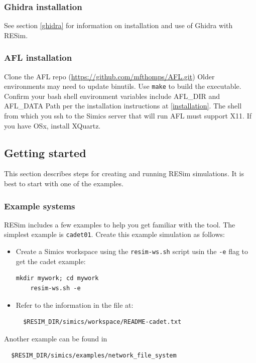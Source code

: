 \documentclass[titlepage]{article}
\begin{document}
\subsubsection{Ghidra installation}
See section \ref{ghidra} for information on installation and use of Ghidra with RESim.

\subsubsection{AFL installation}
Clone the AFL repo (\url{https://github.com/mfthomps/AFL.git})   Older environments may need to update binutils. Use {\tt make} to build the executable.
Confirm your bash shell environment variables include AFL\_DIR and AFL\_DATA Path per the installation instructions at \ref{installation}.
The shell from which you ssh to the Simics server that will run AFL must support X11.  If you have OSx, install XQuartz.

\subsection{Getting started}
\label{getting-started}
This section describes steps for creating and running RESim simulations.
It is best to start with one of the examples.

\subsubsection{Example systems}
RESim includes a few examples to help you get familiar with the tool.  
The simplest example is {\tt cadet01}.  Create this example simulation as follows:
\begin{itemize}
\item Create a Simics workspace using the {\tt resim-ws.sh} script usin the {\tt -e} flag to get the cadet example:
\begin{verbatim}
mkdir mywork; cd mywork
    resim-ws.sh -e
\end{verbatim}
\item Refer to the information in the file at:
\begin{verbatim}
  $RESIM_DIR/simics/workspace/README-cadet.txt
\end{verbatim}
\end{itemize}

Another example can be found in
\begin{verbatim}
  $RESIM_DIR/simics/examples/network_file_system
\end{verbatim}
\end{document}
